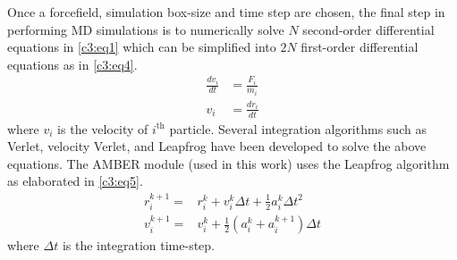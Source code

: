Once a forcefield, simulation box-size and time step are chosen, the final step in performing MD simulations is to numerically solve $N$ second-order differential equations in \cref{c3:eq1} which can be simplified into $2N$ first-order differential equations as in \cref{c3:eq4}. 
\begin{equation}
\begin{split}
\frac{dv_i}{dt} &=\frac{F_i}{m_i} \\
v_i &=  \frac{dr_i}{dt}
\label{c3:eq4}
\end{split}
\end{equation}
where $v_i$ is the velocity of $i^\text{{th}}$ particle. Several integration algorithms such as Verlet, velocity Verlet, and Leapfrog have been developed to solve the above equations. 
The AMBER module (used in this work) uses the Leapfrog algorithm as elaborated in \cref{c3:eq5}. 
\begin{equation}
\begin{split}
r_{i}^{k+1} =& r_{i}^{k} + v_{i}^{k} \Delta t + \frac{1}{2} a_{i}^{k}\Delta t^{2} \\
v_{i}^{k+1} =& v_{i}^{k} + \frac{1}{2} (a_{i}^{k}+a_{i}^{k+1})\Delta t 
\label{c3:eq5}
\end{split}
\end{equation}
where $\Delta t$ is the integration time-step.

